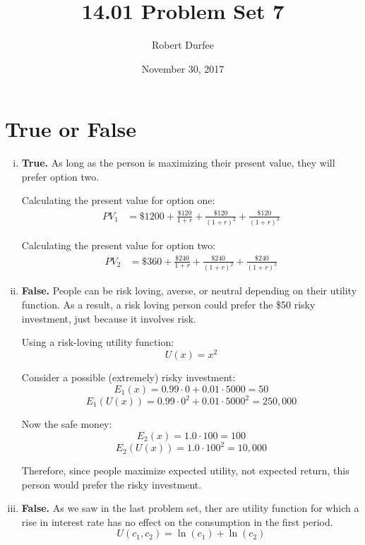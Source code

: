 \documentclass{article}
\title{ 14.01 Problem Set 7 }
\author{ Robert Durfee }
\date{ November 30, 2017 }
\begin{document}
\maketitle

\section{ True or False }

\begin{enumerate}[i.]
    \item \textbf{True.} As long as the person is maximizing their present
        value, they will prefer option two.
        
        Calculating the present value for option one:
        \begin{align*}
            PV_{1} &= \$1200 + \frac{ \$120 }{ 1 + r } + \frac{ \$120 }{ ( 1 + r
        )^{ 2 } } + \frac{ \$120 }{ ( 1 + r )^{3} }
        \end{align*}

        Calculating the present value for option two:
        \begin{align*}
            PV_{2} &= \$360 + \frac{ \$240 }{ 1 + r } + \frac{ \$240 }{ ( 1
        + r )^{2} } + \frac{ \$240 }{ ( 1 + r )^{3} }
        \end{align*}
        
    \item \textbf{False.} People can be risk loving, averse, or neutral
        depending on their utility function. As a result, a risk loving person
        could prefer the \$50 risky investment, just because it involves risk.

        Using a risk-loving utility function:
        $$ U(x) = x^{2} $$

        Consider a possible (extremely) risky investment:
        $$ E_{1}( x ) =  0.99 \cdot 0 + 0.01 \cdot 5000 = 50 $$
        $$ E_{1}( U( x ) ) = 0.99 \cdot 0^{2} + 0.01 \cdot
        5000^{2} = 250,000 $$

        Now the safe money:
        $$  E_{2}( x ) = 1.0 \cdot 100 = 100 $$
        $$ E_{2}(U( x )) = 1.0 \cdot 100^{2} = 10,000 $$

        Therefore, since people maximize expected utility, not expected return,
        this person would prefer the risky investment.

    \item \textbf{False.} As we saw in the last problem set, ther are utility
        function for which a rise in interest rate has no effect on the
        consumption in the first period.
        $$ U( c_{1}, c_{2} ) = \ln( c_{1} ) + \ln( c_{2} ) $$


\end{enumerate}
\end{document}
